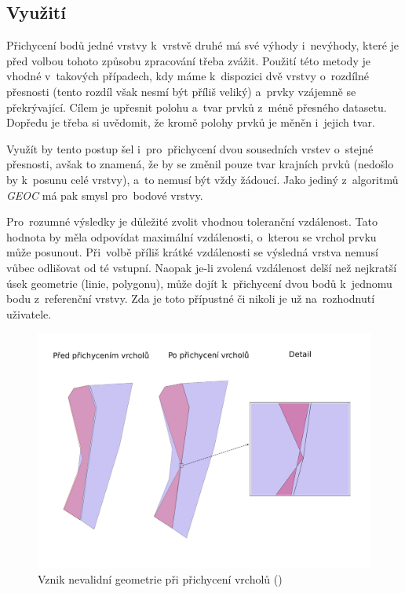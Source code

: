 
\subsection{Využití}
\label{vs-vyuziti}

Přichycení bodů jedné vrstvy k~vrstvě druhé má své výhody i~nevýhody, které 
je před volbou tohoto způsobu zpracování třeba zvážit. Použití této metody 
je vhodné v~takových případech, kdy máme k~dispozici dvě vrstvy o~rozdílné 
přesnosti (tento rozdíl však nesmí být příliš veliký) a~prvky vzájemně se 
překrývající. Cílem je upřesnit polohu a~tvar prvků z~méně přesného datasetu. 
Dopředu je třeba si uvědomit, že kromě polohy prvků je měněn i~jejich tvar.

Využít by tento postup šel i~pro~přichycení dvou sousedních vrstev o~stejné 
přesnosti, avšak to znamená, že by se změnil pouze tvar krajních prvků 
(nedošlo by k~posunu celé vrstvy), a~to nemusí být vždy žádoucí. Jako jediný
z~algoritmů \textit{GEOC} má pak smysl pro~bodové vrstvy.

Pro~rozumné výsledky je důležité zvolit vhodnou toleranční vzdálenost. Tato 
hodnota by měla odpovídat maximální vzdálenosti, o~kterou se vrchol prvku 
může posunout. Při~volbě příliš krátké vzdálenosti se výsledná vrstva nemusí 
vůbec odlišovat od té vstupní. Naopak \mbox{je-li} zvolená vzdálenost delší 
než nejkratší úsek geometrie (linie, polygonu), může dojít k~přichycení dvou 
bodů k~jednomu bodu z~referenční vrstvy. Zda je toto přípustné či nikoli je 
už na~rozhodnutí uživatele.

\label{vsinvalid}
  \begin{figure}[hbt]
    \centering
      \includegraphics[width=350pt]{./pictures/vs-invalid.pdf}
      \caption{Vznik nevalidní geometrie při přichycení vrcholů ()}
      \label{fig:vs-nevalidni}
  \end{figure} 

